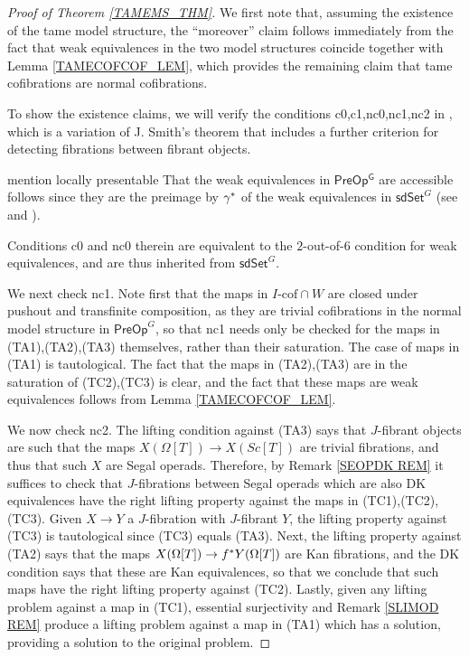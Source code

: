 \documentclass[a4paper,10pt
,draft
]{article}%
\numberwithin{equation}{section}
\numberwithin{figure}{section}
\theoremstyle{definition} %
\newcommand{\1}{\ensuremath{\mathbbm 1}}%
\begin{document}
\begin{proof}[Proof of Theorem \ref{TAMEMS_THM}]
	We first note that, assuming the existence of the tame model structure,
	the ``moreover'' claim
	follows immediately from the fact that weak equivalences in the two model structures coincide together with  
	Lemma \ref{TAMECOFCOF_LEM},
	which provides the remaining claim that tame cofibrations are normal cofibrations.
	
	To show the existence claims, we will verify the conditions c0,c1,nc0,nc1,nc2 in 
	\cite[Prop. 1.3]{Sta14},
	which is a variation of 
	J. Smith's theorem \cite[Thm. 1.7]{Bek00}
	that includes a further criterion for detecting 
	fibrations between fibrant objects.

	{\color{blue} mention locally presentable}
	That the weak equivalences in $\mathsf{PreOp^G}$ are accessible follows since they are the preimage by $\gamma^{\**}$ of the weak equivalences in 
	$\mathsf{sdSet}^G$ 
	(see \cite[Cor. A.2.6.5]{Lur09} and \cite[Cor. A.2.6.6]{Lur09}).

	
	Conditions c0 and nc0 therein are equivalent to the $2$-out-of-$6$
	condition for weak equivalences, and are thus inherited 
	from $\mathsf{sdSet}^G$.
	

We next check nc1. 
Note first that the maps in $I\text{-cof} \cap W$
are closed under pushout and transfinite composition, as they are trivial cofibrations in the normal model structure in 
$\mathsf{PreOp}^G$,
so that nc1 needs only be checked for the maps in (TA1),(TA2),(TA3) themselves, rather than their saturation.
The case of maps in (TA1) is tautological.
The fact that the maps in 
(TA2),(TA3) are in the saturation of (TC2),(TC3) is clear, and the fact that these maps are weak equivalences follows from 
Lemma \ref{TAMECOFCOF_LEM}.

	
We now check nc2.
The lifting condition against (TA3) says that $J$-fibrant objects are such that the maps $X(\Omega[T]) \to X(Sc[T])$
are trivial fibrations, and thus that such $X$ are Segal operads.
Therefore, by Remark \ref{SEOPDK REM} it suffices to check that $J$-fibrations between Segal operads which are also DK equivalences have the right lifting property against the maps in (TC1),(TC2),(TC3).
Given $X \to Y$ a $J$-fibration with $J$-fibrant $Y$,
the lifting property against (TC3) is tautological since 
(TC3) equals (TA3).
Next, the lifting property against (TA2) says that the maps
$X(\Omega[T]) \to f^{\**} Y(\Omega[T])$
are Kan fibrations, and the DK condition says that these are Kan equivalences,
so that we conclude that such maps have the right lifting property against (TC2).
Lastly, given any lifting problem against a map in (TC1),
essential surjectivity and Remark \ref{SLIMOD REM}
produce a lifting problem against a map in (TA1) which has a solution, providing a solution to the original problem.


\end{proof}
\end{document}
